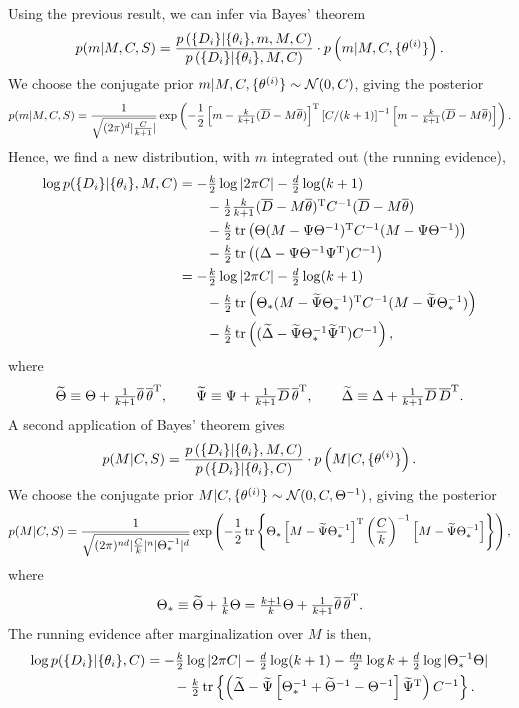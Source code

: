 \documentclass[%
 reprint,
 amsmath,amssymb,
 aps,
]{revtex4-2}
\begin{document}
\begin{widetext}
\noindent Using the previous result, we can infer via Bayes' theorem
$$
	p(m|M,C,S) = \frac{p\left( \{D_i\}|\{\theta_i\},m,M,C \right)}{p\left( \{D_i\}|\{\theta_i\},M,C \right)}\cdot p\left( m|M,C,\{\theta^{(i)}\} \right).
$$
We choose the conjugate prior $m|M,C,\{\theta^{(i)}\}  \sim  \mathcal{N}(0,C)$, giving the posterior
\begin{equation} \label{model_m_pdf}
	p(m|M,C,S) = \frac{1}{\sqrt{(2\pi)^d|\frac{C}{k+1}|}}
		\exp\left( -\frac{1}{2}\left[  m- \tfrac{k}{k+1}(\overline{D}-M\overline{\theta})  \right]^{\mathrm{T}} \left[ C/(k+1) \right]^{-1}\left[  m- \tfrac{k}{k+1}(\overline{D}-M\overline{\theta}) \right] \right).
\end{equation}
Hence, we find a new distribution, with $m$ integrated out (the running evidence),
\begin{align*} 
	\log p(\{D_i\}|\{\theta_i\},M,C)
	&=-\tfrac{k}{2}\log|2\pi C|
			-\tfrac{d}{2}\log(k+1)\\
		&\qquad \textstyle 
			-\tfrac{1}{2}\tfrac{k}{k+1}(\overline{D} -M\overline{\theta})^{\mathrm{T}} C^{-1}(\overline{D} -M\overline{\theta})\\
		&\qquad \textstyle 
			-\frac{k}{2} \tr\left(  \Theta (M-\Psi\Theta^{-1})^{\mathrm{T}} C^{-1}(M-\Psi\Theta^{-1}) \right)\\
		&\qquad \textstyle  
			- \frac{k}{2} \tr\left( (\Delta -  \Psi \Theta^{-1}\Psi^{\mathrm{T}})C^{-1} \right)\\
	&=-\tfrac{k}{2}\log|2\pi C|
			-\tfrac{d}{2}\log(k+1)\\
		&\qquad \textstyle 
			-\frac{k}{2} \tr\left(  \Theta_* (M-\widetilde\Psi\Theta_*^{-1})^{\mathrm{T}} C^{-1}(M-\widetilde\Psi\Theta_*^{-1}) \right)\\
		&\qquad \textstyle  
			- \frac{k}{2} \tr\left( (\widetilde\Delta -  \widetilde\Psi \Theta_*^{-1}\widetilde\Psi^{\mathrm{T}})C^{-1} \right),
\end{align*}
where 	
\begin{align}
	\widetilde\Theta \equiv \Theta + \tfrac{1}{k+1}\overline{\theta}\,\overline{\theta}^{\mathrm{T}},\qquad
	\widetilde\Psi \equiv \Psi + \tfrac{1}{k+1}\overline{D}\,\overline{\theta}^{\mathrm{T}},\qquad
	\widetilde\Delta\equiv \Delta + \tfrac{1}{k+1}\overline{D}\,\overline{D}^{\mathrm{T}}.
\end{align}
 A second application of Bayes' theorem gives
$$
	p(M|C,S) = \frac{p\left( \{D_i\}|\{\theta_i\},M,C \right)}{p\left( \{D_i\}|\{\theta_i\},C \right)}\cdot p\left( M|C,\{\theta^{(i)}\} \right).
$$
We choose the conjugate prior $M|C,\{\theta^{(i)}\}  \sim  \mathcal{N}(0,C,\Theta^{-1})$, giving the posterior
\begin{equation} 
	p(M|C,S) = \frac{1}{\sqrt{(2\pi)^{nd}|\frac{C}{k}|^n|\Theta^{-1}_*|^{d}}}
		\exp\left( -\frac{1}{2}\tr\left\{ \Theta_* \left[ M-\widetilde\Psi\Theta_*^{-1} \right]^{\mathrm{T}} \left( \frac{C}{k} \right)^{-1}\left[ M-\widetilde\Psi\Theta_*^{-1} \right] \right\} \right),
\end{equation}
where 
\begin{equation}
	\Theta_* \equiv \widetilde\Theta + \tfrac{1}{k}\Theta = \tfrac{k+1}{k}\Theta + \tfrac{1}{k+1}\overline{\theta}\,\overline{\theta}^{\mathrm{T}}.
\end{equation}
The running evidence after marginalization over $M$ is then,
\begin{align*} 
	\log p(\{D_i\}|\{\theta_i\},C)
	&=-\tfrac{k}{2}\log|2\pi C| -\tfrac{d}{2}\log(k+1) -\tfrac{dn}{2}\log k+\tfrac{d}{2}\log|\Theta_*^{-1}\Theta|\\
		&\qquad \textstyle 
			- \frac{k}{2} \tr\left\{ \left( \widetilde\Delta -  \widetilde\Psi \left[ \Theta_*^{-1}+\widetilde\Theta^{-1}- \Theta^{-1} \right]\widetilde\Psi^{\mathrm{T}} \right)C^{-1} \right\}.
\end{align*}


\end{widetext}
\end{document}
